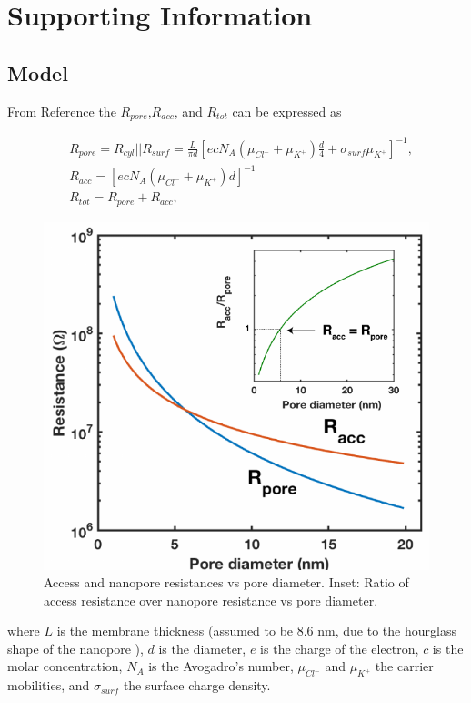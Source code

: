 \newpage
\section{Supporting Information}

\renewcommand{\thefigure}{S\thechapter.\arabic{figure}}
\renewcommand{\thetable}{S\thechapter.\arabic{table}}
\renewcommand{\theequation}{S\thechapter.\arabic{equation}}


\subsection{Model}\label{sec:S2.4.1}
From Reference \cite{Kowalczyk2011b,Smeets2006} the $R_{pore}$,$R_{acc}$, and $R_{tot}$ can be expressed as 

\begin{align}
\label{eqn:Eq2.21}
&R_{pore}=R_{cyl} ||R_{surf}=\frac{L}{\pi d} \left[ecN_A(\mu_{Cl^-}+\mu_{K^+})\frac{d}{4}+\sigma_{surf}\mu_{K^+}\right]^{-1},\\
\label{eqn:Eq2.22}
&R_{acc}=\left[ecN_A(\mu_{Cl^-}+\mu_{K^+})d\right]^{-1}\\
\label{eqn:Eq2.23}
&R_{tot}=R_{pore}+R_{acc},
\end{align}

\begin{figure}[h]
	\centering
	\includegraphics[width=0.6\linewidth]{figures/Figure2.4.pdf}
	\caption{Access and nanopore resistances vs pore diameter. Inset: Ratio of access resistance over nanopore resistance vs pore diameter.}
	\label{fig:fig.2.4}
\end{figure}


\noindent where $L$ is the membrane thickness (assumed to be 8.6 nm, due to the hourglass shape of the nanopore \cite{Kowalczyk2011b}), $d$ is the diameter, $e$ is the charge of the electron, $c$ is the molar concentration, $N_A$ is the Avogadro’s number, $\mu_{Cl^-}$ and $\mu_{K^+}$ the carrier mobilities, and $\sigma_{surf}$ the surface charge density.







